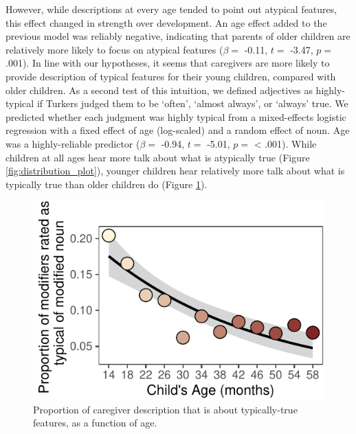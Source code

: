 \documentclass[10pt, letterpaper]{article}
\newenvironment{CodeChunk}{}{}
\begin{document}
However, while descriptions at every age tended to point out atypical
features, this effect changed in strength over development. An age
effect added to the previous model was reliably negative, indicating
that parents of older children are relatively more likely to focus on
atypical features (\(\beta =\) -0.11, \(t =\) -3.47, \(p =\) .001). In
line with our hypotheses, it seems that caregivers are more likely to
provide description of typical features for their young children,
compared with older children. As a second test of this intuition, we
defined adjectives as highly-typical if Turkers judged them to be
`often', `almost always', or `always' true. We predicted whether each
judgment was highly typical from a mixed-effects logistic regression
with a fixed effect of age (log-scaled) and a random effect of noun. Age
was a highly-reliable predictor (\(\beta =\) -0.94, \(t =\) -5.01,
\(p =\) \textless{} .001). While children at all ages hear more talk
about what is atypically true (Figure \ref{fig:distribution_plot}),
younger children hear relatively more talk about what is typically true
than older children do (Figure \ref{fig:prototypical_plot}).

\begin{CodeChunk}
\begin{figure}[tb]

{\centering \includegraphics{figs/prototypical_plot-1} 

}

\caption[Proportion of caregiver description that is about typically-true features, as a function of age]{Proportion of caregiver description that is about typically-true features, as a function of age.}\label{fig:prototypical_plot}
\end{figure}
\end{CodeChunk}
\end{document}
